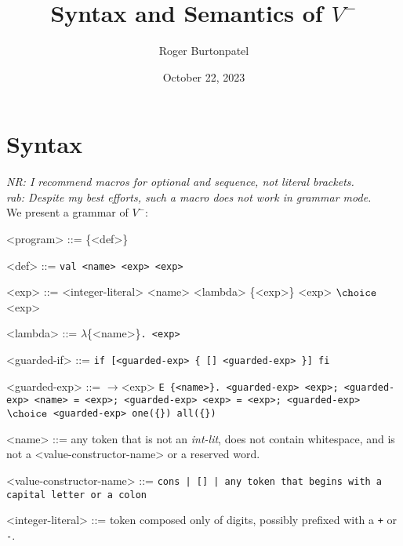 \documentclass[]{article}
\title{Syntax and Semantics of $V^{-}$}
\author{Roger Burtonpatel}
\date{October 22, 2023}
\newcommand\nr[1]{\leavevmode\emph{NR: #1}}
\newcommand\rab[1]{\leavevmode\emph{rab: #1}}
\begin{document}
\maketitle

\section{Syntax}

\nr{I recommend macros for optional and sequence, not literal brackets.} \\
\rab{Despite my best efforts, such a macro does not work in grammar mode.} \\
We present a grammar of $V^{-}$: 

\bigskip


\begin{grammar}
    <program> ::= \{{<def>}\}
    
    <def> ::= \tt{val} <name> <exp>
        \alt <exp>
    
        
        
        <exp> ::= <integer-literal>
        \alt <name>
        \alt <lambda>
         \{<exp>\}
        \alt <exp> $\choice$ <exp>
        
        
        <lambda> ::= $\lambda$\{<name>\}\tt{.} <exp>
        
        <guarded-if> ::= \tt{if}  [<guarded-exp> \{ [] <guarded-exp> \}] \tt{fi}
        
        
        <guarded-exp> ::= $\boldsymbol{\rightarrow}$<exp>
        \alt  \tt{E} \{<name>\}\tt{.} <guarded-exp>
        \alt  <exp>\tt{;} <guarded-exp>
        \alt   <name> \tt{=} <exp>\tt{;} <guarded-exp>
        \alt   <exp> \tt{=} <exp>\tt{;} <guarded-exp>
         $\choice$ <guarded-exp> 
        \alt   \tt{one}(\{<guarded-exp>\})
        \alt   \tt{all}(\{<guarded-exp>\})
        
        <name> ::= any token that is not an \textit{int-lit}, does not contain 
        whitespace,
        and is not a <value-constructor-name> or a reserved word.

        <value-constructor-name> ::= \tt{cons} | \tt{[]} | any token that begins
        with a capital letter or a colon
    
        <integer-literal> ::= token composed only of digits, possibly prefixed with a \texttt{+} or \texttt{-}.
    
    \end{grammar}
\end{document}
